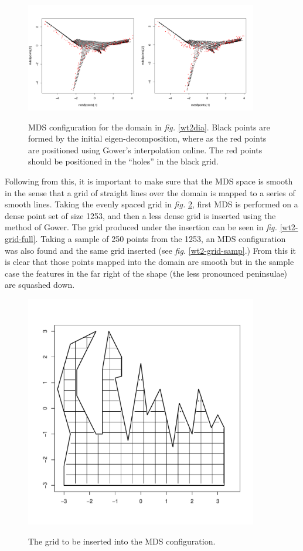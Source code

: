 \documentclass[a4paper,10pt]{article}
\newcommand{\fig}[1]{\emph{fig.} \ref{#1}}
\begin{document}
\begin{figure}
\centering
\includegraphics[width=4in]{figs/gowererror.pdf} \\
\caption{MDS configuration for the domain in \fig{wt2dia}. Black points are formed by the initial eigen-decomposition, where as the red points are positioned using Gower's interpolation online. The red points should be positioned in the ``holes'' in the black grid.}
\label{gowererror}
\end{figure}


Following from this, it is important to make sure that the MDS space is smooth in the sense that a grid of straight lines over the domain is mapped to a series of smooth lines. Taking the evenly spaced grid in \fig{wt2-grid-orig}, first MDS is performed on a dense point set of size 1253, and then a less dense grid is inserted using the method of Gower. The grid produced under the insertion can be seen in \fig{wt2-grid-full}. Taking a sample of 250 points from the 1253, an MDS configuration was also found and the same grid inserted (see \fig{wt2-grid-samp}.) From this it is clear that those points mapped into the domain are smooth but in the sample case the features in the far right of the shape (the less pronounced peninsulae) are squashed down.



\begin{figure}
\centering
\includegraphics[width=4in]{figs/wt2-grid-orig.pdf} \\
\caption{The grid to be inserted into the MDS configuration.}
\label{wt2-grid-orig}
\end{figure}
\end{document}
